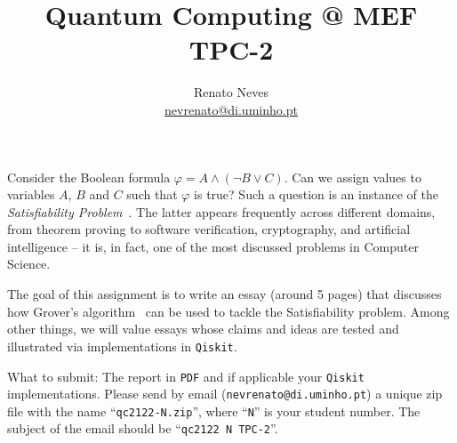 \documentclass[a4paper, 11pt]{article}
\date{}
\theoremstyle{definition}
\begin{document}
\allowdisplaybreaks[2]
\title{Quantum Computing @ MEF \\ \small{TPC-2}}
\author{Renato Neves \\ \scriptsize
  \href{mailto:nevrenato@di.uminho.pt}{nevrenato@di.uminho.pt}}
\maketitle

\noindent
Consider the Boolean formula $\varphi = A \wedge (\neg B \vee C)$. Can
we assign values to variables $A$, $B$ and $C$ such that $\varphi$ is
true? Such a question is an instance of the \emph{Satisfiability
  Problem}~\cite{schoning13}. The latter appears frequently across
different domains, from theorem proving to software verification,
cryptography, and artificial intelligence -- it is, in fact, one of
the most discussed problems in Computer Science.

The goal of this assignment is to write an essay (around 5 pages) that
discusses how Grover's algorithm~\cite{nielsen16} can be used to
tackle the Satisfiability problem. Among other things, we will value
essays whose claims and ideas are tested and illustrated via
implementations in \texttt{Qiskit}.

\begin{mdframed}
  What to submit: The report in \texttt{PDF} and if applicable your
  \texttt{Qiskit} implementations. Please send by email
  (\texttt{nevrenato@di.uminho.pt}) a unique zip file with the name
  ``\texttt{qc2122-N.zip}'', where ``\texttt{N}'' is your student
  number.  The subject of the email should be ``\texttt{qc2122 N
    TPC-2}''.
\end{mdframed}





\end{document}
